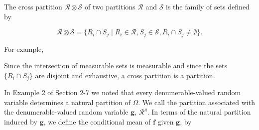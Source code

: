 The cross partition $\mathcal{R} \otimes \mathcal{S}$ of two partitions $\mathcal{R}$ and $\mathcal{S}$ is the family of sets defined by

$$\mathcal{R} \otimes \mathcal{S} = \{R_i \cap S_j \mid R_i \in \mathcal{R}, S_j \in \mathcal{S}, R_i \cap S_j \neq \emptyset\}.$$

For example,

Since the intersection of measurable sets is measurable and since the sets $\{R_i \cap S_j\}$ are disjoint and exhaustive, a cross partition is a partition.

In Example 2 of Section 2-7 we noted that every denumerable-valued random variable determines a natural partition of $\Omega$. We call the partition associated with the denumerable-valued random variable $\mathbf{g}$, $\mathcal{R}^g$. In terms of the natural partition induced by $\mathbf{g}$, we define the conditional mean of $\mathbf{f}$ given $\mathbf{g}$, by
